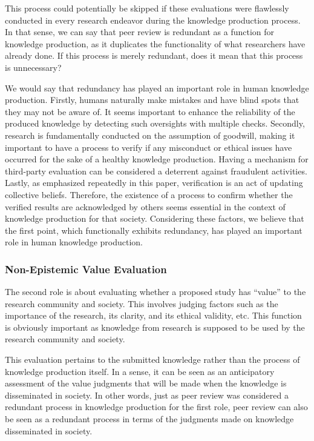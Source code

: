 \documentclass{book}
\begin{document}
This process could potentially be skipped if these evaluations were flawlessly conducted in every research endeavor during the knowledge production process. In that sense, we can say that peer review is redundant as a function for knowledge production, as it duplicates the functionality of what researchers have already done. If this process is merely redundant, does it mean that this process is unnecessary?

We would say that redundancy has played an important role in human knowledge production. Firstly, humans naturally make mistakes and have blind spots that they may not be aware of. It seems important to enhance the reliability of the produced knowledge by detecting such oversights with multiple checks. Secondly, research is fundamentally conducted on the assumption of goodwill, making it important to have a process to verify if any misconduct or ethical issues have occurred for the sake of a healthy knowledge production. Having a mechanism for third-party evaluation can be considered a deterrent against fraudulent activities. Lastly, as emphasized repeatedly in this paper, verification is an act of updating collective beliefs. Therefore, the existence of a process to confirm whether the verified results are acknowledged by others seems essential in the context of knowledge production for that society. Considering these factors, we believe that the first point, which functionally exhibits redundancy, has played an important role in human knowledge production.

\subsubsection{Non-Epistemic Value Evaluation}

The second role is about evaluating whether a proposed study has ``value'' to the research community and society. This involves judging factors such as the importance of the research, its clarity, and its ethical validity, etc. This function is obviously important as knowledge from research is supposed to be used by the research community and society.

This evaluation pertains to the submitted knowledge rather than the process of knowledge production itself. In a sense, it can be seen as an anticipatory assessment of the value judgments that will be made when the knowledge is disseminated in society. In other words, just as peer review was considered a redundant process in knowledge production for the first role, peer review can also be seen as a redundant process in terms of the judgments made on knowledge disseminated in society.
\end{document}
